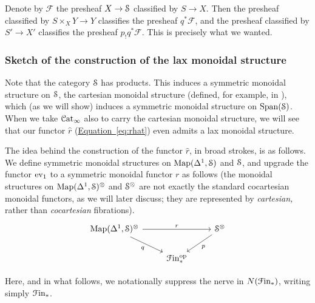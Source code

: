 \documentclass[main.tex]{subfiles}
\begin{document}
Denote by $\mathcal{F}$ the presheaf $X \to \S$ classified by $S \to X$. Then the presheaf classified by $S \times_{X} Y \to Y$ classifies the presheaf $q^{*}\mathcal{F}$, and the presheaf classified by $S' \to X'$ classifies the presheaf $p_{!}q^{*}\mathcal{F}$. This is precisely what we wanted.

\subsubsection{Sketch of the construction of the lax monoidal structure}

Note that the category $\S$ has products. This induces a symmetric monoidal structure on $\S$, the cartesian monoidal structure (defined, for example, in \cite[Sec.~2.4.1]{luriehigheralgebra}), which (as we will show) induces a symmetric monoidal structure on $\Span(\S)$. When we take $\Cat_{\infty}$ also to carry the cartesian monoidal structure, we will see that our functor $\hat{r}$ (\hyperref[eq:rhat]{Equation~\ref*{eq:rhat}}) even admits a lax monoidal structure.

The idea behind the construction of the functor $\hat{r}$, in broad strokes, is as follows. We define symmetric monoidal structures on $\Map(\Delta^{1}, \S)$ and $\S$, and upgrade the functor $\ev_{1}$ to a symmetric monoidal functor $r$ as follows (the monoidal structures on $\Map(\Delta^{1}, \S)^{\otimes}$ and $\S^{\otimes}$ are not exactly the standard cocartesian monoidal functors, as we will later discuss; they are represented by \emph{cartesian,} rather than \emph{cocartesian} fibrations).
\begin{equation}
  \label{eq:wishlist_prq}
  \begin{tikzcd}
    \Map(\Delta^{1}, \S)^{\otimes}
    \arrow[rr, "r"]
    \arrow[dr, swap, "q"]
    && \S^{\otimes}
    \arrow[dl, "p"]
    \\
    & \Finp\op
  \end{tikzcd}
\end{equation}

\begin{note}
  Here, and in what follows, we notationally suppress the nerve in $N(\Finp)$, writing simply $\Finp$.
\end{note}
\end{document}
